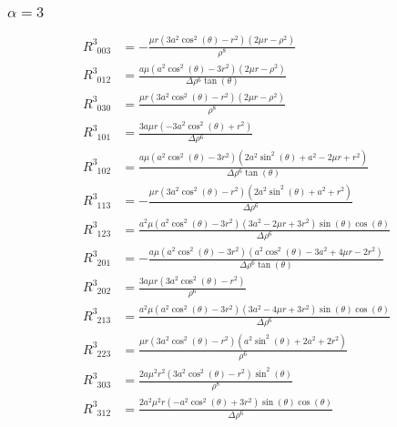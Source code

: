 \documentclass[11pt,a4paper]{article}
\begin{document}
\subsubsection*{$\alpha = 3$}
\begin{align}
R^3_{\phantom{3} 0 0 3} &=- \frac{\mu r \left(3 a^{2} \cos^{2}{\left(\theta \right)} - r^{2}\right) \left(2 \mu r - \rho^{2}\right)}{\rho^{8}}\\
R^3_{\phantom{3} 0 1 2} &=\frac{a \mu \left(a^{2} \cos^{2}{\left(\theta \right)} - 3 r^{2}\right) \left(2 \mu r - \rho^{2}\right)}{\Delta \rho^{6} \tan{\left(\theta \right)}}\\
R^3_{\phantom{3} 0 3 0} &=\frac{\mu r \left(3 a^{2} \cos^{2}{\left(\theta \right)} - r^{2}\right) \left(2 \mu r - \rho^{2}\right)}{\rho^{8}}\\
R^3_{\phantom{3} 1 0 1} &=\frac{3 a \mu r \left(- 3 a^{2} \cos^{2}{\left(\theta \right)} + r^{2}\right)}{\Delta \rho^{6}}\\
R^3_{\phantom{3} 1 0 2} &=\frac{a \mu \left(a^{2} \cos^{2}{\left(\theta \right)} - 3 r^{2}\right) \left(2 a^{2} \sin^{2}{\left(\theta \right)} + a^{2} - 2 \mu r + r^{2}\right)}{\Delta \rho^{6} \tan{\left(\theta \right)}}\\
R^3_{\phantom{3} 1 1 3} &=- \frac{\mu r \left(3 a^{2} \cos^{2}{\left(\theta \right)} - r^{2}\right) \left(2 a^{2} \sin^{2}{\left(\theta \right)} + a^{2} + r^{2}\right)}{\Delta \rho^{6}}\\
R^3_{\phantom{3} 1 2 3} &=\frac{a^{2} \mu \left(a^{2} \cos^{2}{\left(\theta \right)} - 3 r^{2}\right) \left(3 a^{2} - 2 \mu r + 3 r^{2}\right) \sin{\left(\theta \right)} \cos{\left(\theta \right)}}{\Delta \rho^{6}}\\
R^3_{\phantom{3} 2 0 1} &=- \frac{a \mu \left(a^{2} \cos^{2}{\left(\theta \right)} - 3 r^{2}\right) \left(a^{2} \cos^{2}{\left(\theta \right)} - 3 a^{2} + 4 \mu r - 2 r^{2}\right)}{\Delta \rho^{6} \tan{\left(\theta \right)}}\\
R^3_{\phantom{3} 2 0 2} &=\frac{3 a \mu r \left(3 a^{2} \cos^{2}{\left(\theta \right)} - r^{2}\right)}{\rho^{6}}\\
R^3_{\phantom{3} 2 1 3} &=\frac{a^{2} \mu \left(a^{2} \cos^{2}{\left(\theta \right)} - 3 r^{2}\right) \left(3 a^{2} - 4 \mu r + 3 r^{2}\right) \sin{\left(\theta \right)} \cos{\left(\theta \right)}}{\Delta \rho^{6}}\\
R^3_{\phantom{3} 2 2 3} &=\frac{\mu r \left(3 a^{2} \cos^{2}{\left(\theta \right)} - r^{2}\right) \left(a^{2} \sin^{2}{\left(\theta \right)} + 2 a^{2} + 2 r^{2}\right)}{\rho^{6}}\\
R^3_{\phantom{3} 3 0 3} &=\frac{2 a \mu^{2} r^{2} \left(3 a^{2} \cos^{2}{\left(\theta \right)} - r^{2}\right) \sin^{2}{\left(\theta \right)}}{\rho^{8}}\\
R^3_{\phantom{3} 3 1 2} &=\frac{2 a^{2} \mu^{2} r \left(- a^{2} \cos^{2}{\left(\theta \right)} + 3 r^{2}\right) \sin{\left(\theta \right)} \cos{\left(\theta \right)}}{\Delta \rho^{6}}\\
\end{align}
\end{document}
